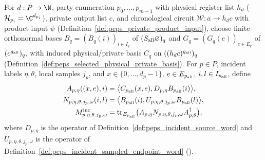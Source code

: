\begin{definition}
    \label{def:peps_incident_sampled_physical_factor}
    \leanok
    For $d:P\to\N$, party enumeration $p_0,\ldots,p_{m-1}$ with physical
    register list $h_d$ ($\mathcal H_{p_i}=\C^{d_{p_i}}$), private output list $c$,
    and chronological circuit $\mathcal W:a\to h_dc$ with product input $\psi$
    (Definition~\ref{def:peps_private_product_input}), choose finite orthonormal
    bases $B_q=(B_q(i))_{i\in I_q}$ of $(S_{\rm all}\varnothing)_q$ and
    $G_q=(G_q(e))_{e\in E_q}$ of $(c^{g_{\rm all}})_q$, with induced
    physical/private basis $C_q$ on $((h_dc)^{g_{\rm all}})_q$
    (Definition~\ref{def:peps_selected_physical_private_basis}). For $p\in P$,
    incident labels $\eta,\theta$, local samples $j_p$, and $x\in\{0,\ldots,d_p-1\}$,
    $e\in E_{p_{\rm all}}$, $i,l\in I_{p_{\rm all}}$, define
    \begin{align}
        A_{p,\eta}((x,e),i)
         & =\bigl\langle C_{p_{\rm all}}(x,e),
        D_{p,\eta}B_{p_{\rm all}}(i)\bigr\rangle,                   \\
        N_{p,\eta,\theta,j_p,\omega}(i,l)
         & =\bigl\langle B_{p_{\rm all}}(i),
        U_{p,\eta,\theta,j_p,\omega}B_{p_{\rm all}}(l)\bigr\rangle, \\
        M^{\rm inc}_{p,\eta,\theta,j_p,\omega}
         & =\operatorname{tr}_{E_{p_{\rm all}}}
        \bigl(A_{p,\eta}N_{p,\eta,\theta,j_p,\omega}A_{p,\theta}^{\dagger}\bigr),
        \label{eq:peps_incident_sampled_physical_factor}
    \end{align}
    where $D_{p,\eta}$ is the operator of Definition~\ref{def:peps_incident_source_word}
    and $U_{p,\eta,\theta,j_p,\omega}$ is the operator of
    Definition~\ref{def:peps_incident_sampled_endpoint_word}
    (\cite[proof of Theorem~5.2]{OpenAI2026PolynomialPEPS}).
\end{definition}


